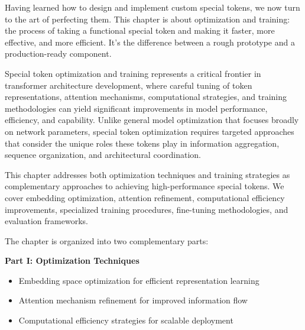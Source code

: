 
Having learned how to design and implement custom special tokens, we now turn to the art of perfecting them. This chapter is about optimization and training: the process of taking a functional special token and making it faster, more effective, and more efficient. It's the difference between a rough prototype and a production-ready component.

Special token optimization and training represents a critical frontier in transformer architecture development, where careful tuning of token representations, attention mechanisms, computational strategies, and training methodologies can yield significant improvements in model performance, efficiency, and capability. Unlike general model optimization that focuses broadly on network parameters, special token optimization requires targeted approaches that consider the unique roles these tokens play in information aggregation, sequence organization, and architectural coordination.

This chapter addresses both optimization techniques and training strategies as complementary approaches to achieving high-performance special tokens. We cover embedding optimization, attention refinement, computational efficiency improvements, specialized training procedures, fine-tuning methodologies, and evaluation frameworks.

\begin{comment}
Feedback: This is a strong opening. To make it even more compelling, you could frame it as moving from "design" to "refinement." For example: "Having learned how to design and implement custom special tokens, we now turn to the art of perfecting them. This chapter is about optimization: the process of taking a functional special token and making it faster, more effective, and more efficient. It's the difference between a rough prototype and a production-ready component."

STATUS: addressed - integrated the suggested framing and expanded to include training aspects
\end{comment}

The chapter is organized into two complementary parts:

\textbf{Part I: Optimization Techniques}
\begin{itemize}
\item Embedding space optimization for efficient representation learning
\item Attention mechanism refinement for improved information flow
\item Computational efficiency strategies for scalable deployment
\end{itemize}

